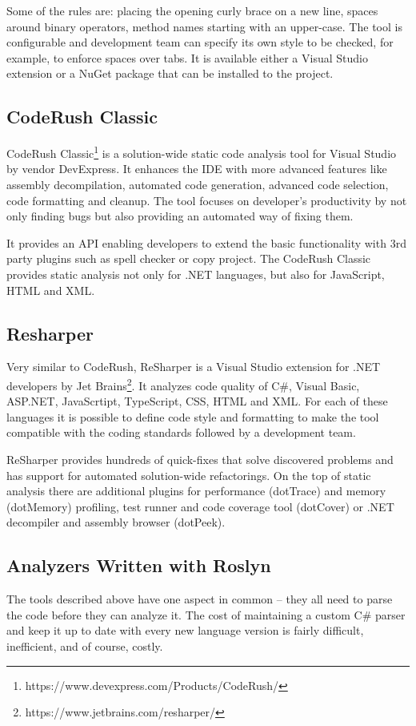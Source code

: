 \documentclass[
  digital, %
  table,   %
  lof,     %
  lot,     %
  oneside,
]{fithesis3}
\begin{document}
Some of the rules are: placing the opening curly brace on a new line, spaces around binary operators, method names starting with an upper-case. The tool is configurable and development team can specify its own style to be checked, for example, to enforce spaces over tabs. It is available either a Visual Studio extension or a NuGet package that can be installed to the project.

\subsection{CodeRush Classic}
CodeRush Classic\footnote{https://www.devexpress.com/Products/CodeRush/} is a solution-wide static code analysis tool for Visual Studio by vendor DevExpress. It enhances the IDE with more advanced features like assembly decompilation, automated code generation, advanced code selection, code formatting and cleanup. The tool focuses on developer's productivity by not only finding bugs but also providing an automated way of fixing them.

It provides an API enabling developers to extend the basic functionality with 3rd party plugins such as spell checker or copy project. The CodeRush Classic provides static analysis not only for .NET languages, but also for JavaScript, HTML and XML.

\subsection{Resharper}
Very similar to CodeRush, ReSharper is a Visual Studio extension for .NET developers by Jet Brains\footnote{https://www.jetbrains.com/resharper/}. It analyzes code quality of C\#, Visual Basic, ASP.NET, JavaScrtipt, TypeScript, CSS, HTML and XML. For each of these languages it is possible to define code style and formatting to make the tool compatible with the coding standards followed by a development team. 

ReSharper provides hundreds of quick-fixes that solve discovered problems and has support for automated solution-wide refactorings. On the top of static analysis there are additional plugins for performance (dotTrace) and memory (dotMemory) profiling, test runner and code coverage tool (dotCover) or .NET decompiler and assembly browser (dotPeek).


\subsection{Analyzers Written with Roslyn}
The tools described above have one aspect in common -- they all need to parse the code before they can analyze it. The cost of maintaining a custom C\# parser and keep it up to date with every new language version is fairly difficult, inefficient, and of course, costly. 
\end{document}
